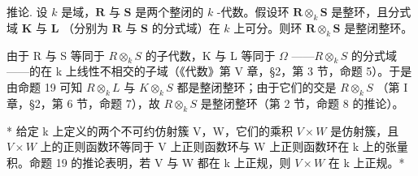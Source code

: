 推论. 设 \(k\) 是域，\(\mathbf{R}\) 与 \(\mathbf{S}\) 是两个整闭的 \(k\) -代数。假设环 \(\mathbf{R} \otimes_k \mathbf{S}\) 是整环，且分式域 \(\mathbf{K}\) 与 \(\mathbf{L}\) （分别为 \(\mathbf{R}\) 与 \(\mathbf{S}\) 的分式域）在 \(k\) 上可分。则环 \(\mathbf{R} \otimes_k \mathbf{S}\) 是整闭整环。

由于 R 与 S 等同于 \(R \otimes_{k} S\) 的子代数，K 与 L 等同于 \(\Omega\) ——\(R \otimes_{k} S\) 的分式域——的在 k 上线性不相交的子域（《代数》第 V 章，§2，第 3 节，命题 5）。于是由命题 19 可知 \(R \otimes_{k} L\) 与 \(K \otimes_{k} S\) 都是整闭整环；由于它们的交是 \(R \otimes_{k} S\) （第 I 章，§2，第 6 节，命题 7），故 \(R \otimes_{k} S\) 是整闭整环（第 2 节，命题 8 的推论）。

* 给定 k 上定义的两个不可约仿射簇 V，W，它们的乘积 \(V \times W\) 是仿射簇，且 \(V \times W\) 上的正则函数环等同于 V 上正则函数环与 W 上正则函数环在 k 上的张量积。命题 19 的推论表明，若 V 与 W 都在 k 上正规，则 \(V \times W\) 在 k 上正规。*

